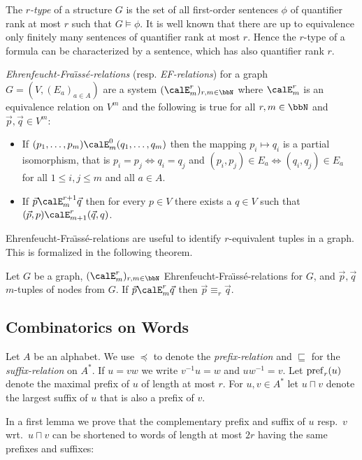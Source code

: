 The \emph{$r$-type} of a structure $G$ is the set of all first-order sentences $\phi$ of quantifier rank at most $r$ such that $G\models \phi$. It is well known that there are up to equivalence only
finitely many sentences of quantifier rank at most $r$. Hence the $r$-type of a formula can be characterized by a sentence, which has also quantifier rank $r$. 

\emph{Ehrenfeucht-Fra\"\i{}ss\'e-relations} (resp. \emph{EF-relations}) for a graph $G = (V, (E_a)_{a\in A})$ are a system $(\calE^r_m)_{r,m\in\bbN}$ where  $\calE^r_m$ is an equivalence relation on $V^m$ and
the following is true for all $r,m\in\bbN$ and $\vec{p},\vec{q} \in V^m$:
\begin{itemize}
	\item If $(p_1,\ldots,p_m) \calE^0_m (q_1,\ldots,q_m)$ then the mapping $p_i \mapsto q_i$ is a partial isomorphism, that is $p_i= p_j \Leftrightarrow q_i=q_j$ and
	$(p_i,p_j)\in E_a \Leftrightarrow (q_i,q_j) \in E_a$ for all $1\leq i,j\leq m$ and all $a\in A$.
	\item If $\vec{p} \calE^{r+1}_m \vec{q}$ then for every $p\in V$ there exists a $q\in V$ such that $(\vec{p}, p) \calE^r_{m+1} (\vec{q}, q)$.
\end{itemize}

Ehrenfeucht-Fra\"\i{}ss\'e-relations are useful to identify $r$-equivalent tuples in a graph. This is formalized in the following theorem.
\begin{theorem}
	Let $G$ be a graph, $(\calE^r_m)_{r,m\in\bbN}$ Ehrenfeucht-Fra\"\i{}ss\'e-relations for $G$, and $\vec{p}, \vec{q}$ $m$-tuples of nodes from $G$. If $\vec{p} \calE^r_m \vec{q}$ then 
	$\vec{p} \equiv_r \vec{q}$.
\end{theorem} 

\subsection{Combinatorics on Words}
Let $A$ be an alphabet. We use $\preceq$ to denote the \emph{prefix-relation} and $\sqsubseteq$ for the \emph{suffix-relation} on $A^\ast$.  If $u= vw$ we write $v^{-1}u = w$ and
$uw^{-1} = v$.
Let $\operatorname{pref}_r(u)$ denote the maximal prefix of $u$ of length at most $r$. For $u,v\in A^\ast$ let $u \sqcap v$ denote the largest suffix of $u$ that is also a prefix of $v$.

In a first lemma we prove that the complementary prefix and suffix of $u$ resp.~$v$ wrt.~$u\sqcap v$ can be shortened to words of length at most $2r$ having the same prefixes and suffixes:

